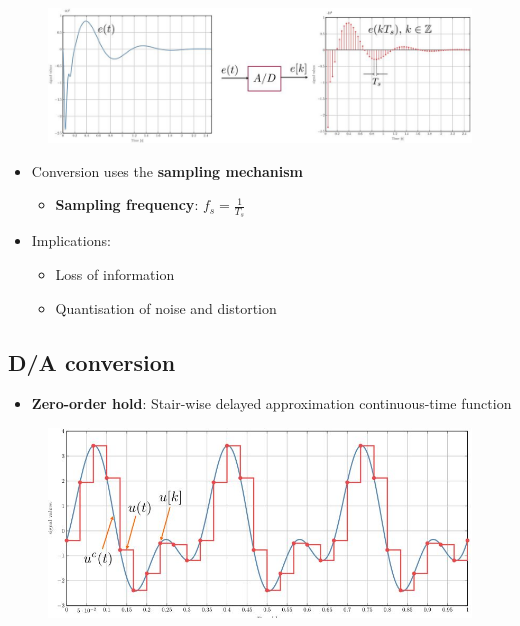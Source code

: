\documentclass[conference]{IEEEtran}
\begin{document}
\begin{figure} [h!]
    \centering
    \includegraphics[scale=0.4]{Ex6.JPG}
\end{figure}

\begin{itemize}
    \item  Conversion uses the \textbf{sampling mechanism} 
    \begin{itemize}
        \item \textbf{Sampling frequency}: $f_s = \frac{1}{T_s}$
    \end{itemize}
    \item Implications:
    \begin{itemize}
        \item Loss of information 
        \item Quantisation of noise and distortion 
    \end{itemize}
\end{itemize}

\pagebreak
\subsection{D/A conversion}

\begin{itemize}
    \item \textbf{Zero-order hold}: Stair-wise delayed approximation continuous-time function
\end{itemize}
\begin{figure} [h!]
    \centering
    \includegraphics[scale=0.4]{Ex7.JPG}
\end{figure}
\end{document}
